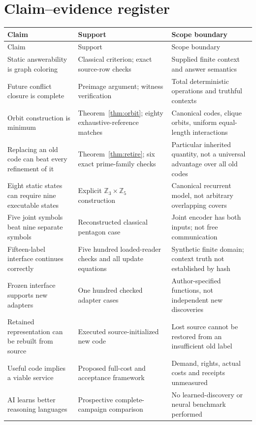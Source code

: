 \documentclass[11pt,letterpaper]{article}
\theoremstyle{remark}\newtheorem{remark}{Remark}[section]
\begin{document}
\section{Claim--evidence register}
\label{app:claims}
\small
\begin{longtable}{@{}P{.28\linewidth}P{.33\linewidth}P{.32\linewidth}@{}}\toprule
Claim & Support & Scope boundary\\\midrule\endfirsthead
\toprule Claim & Support & Scope boundary\\\midrule\endhead
Static answerability is graph coloring & Classical criterion; exact source-row checks & Supplied finite context and answer semantics\\
Future conflict closure is complete & Preimage argument; witness verification & Total deterministic operations and truthful contexts\\
Orbit construction is minimum & Theorem~\ref{thm:orbit}; eighty exhaustive-reference matches & Canonical codes, clique orbits, uniform equal-length interactions\\
Replacing an old code can beat every refinement of it & Theorem~\ref{thm:retire}; six exact prime-family checks & Particular inherited quantity, not a universal advantage over all old codes\\
Eight static states can require nine executable states & Explicit $\mathbb Z_3\times\mathbb Z_5$ construction & Canonical recurrent model, not arbitrary overlapping covers\\
Five joint symbols beat nine separate symbols & Reconstructed classical pentagon case & Joint encoder has both inputs; not free communication\\
Fifteen-label interface continues correctly & Five hundred loaded-reader checks and all update equations & Synthetic finite domain; context truth not established by hash\\
Frozen interface supports new adapters & One hundred checked adapter cases & Author-specified functions, not independent new discoveries\\
Retained representation can be rebuilt from source & Executed source-initialized new code & Lost source cannot be restored from an insufficient old label\\
Useful code implies a viable service & Proposed full-cost and acceptance framework & Demand, rights, actual costs and receipts unmeasured\\
AI learns better reasoning languages & Prospective complete-campaign comparison & No learned-discovery or neural benchmark performed\\\bottomrule
\end{longtable}
\normalsize
\end{document}
